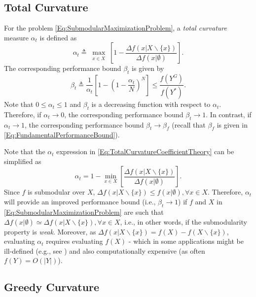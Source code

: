 \documentclass[conference]{IEEEtran}
\begin{document}
\subsection{Total Curvature \cite{Conforti1984}}
\label{SubSec:TotalCurvature}

For the problem \eqref{Eq:SubmodularMaximizationProblem}, a \emph{total curvature} measure $\alpha_t$ is defined as 
\begin{equation}\label{Eq:TotalCurvatureCoefficientTheory}
    \alpha_t \triangleq \max_{\substack{x \in X} }\left[1 - \frac{\Delta f(x \vert X \backslash \{x\})}{\Delta f(x \vert \emptyset)}\right].
\end{equation}
The corresponding performance bound $\beta_t$ is given by
\begin{equation}\label{Eq:TotalCurvatureBoundTheory}
    \beta_t \triangleq \frac{1}{\alpha_t} \left[ 1 - \left( 1 -\frac{\alpha_t}{N} \right)^N \right] \leq \frac{f(Y^G)}{f(Y^*)}.
\end{equation}
Note that $0 \leq \alpha_t \leq 1$ and $\beta_t$ is a decreasing function with respect to $\alpha_t$. Therefore, if $\alpha_t\rightarrow 0$, the corresponding performance bound $\beta_t\rightarrow 1$. In contrast, if $\alpha_t\rightarrow 1$, the corresponding performance bound $\beta_t\rightarrow\beta_f$ (recall that $\beta_f$ is given in \eqref{Eq:FundamentalPerformanceBound}).


Note that the $\alpha_t$ expression in \eqref{Eq:TotalCurvatureCoefficientTheory} can be simplified as
$$ 
    \alpha_t = 1 - \min_{x \in X}\left[\frac{\Delta f(x \vert X \backslash \{x\})}{\Delta f(x \vert \emptyset)}\right].
$$
Since $f$ is submodular over $X$, $\Delta f(x \vert X \backslash \{x\}) \leq f(x \vert \emptyset), \forall x \in X$. Therefore, $\alpha_t$ will provide an improved performance bound (i.e., $\beta_t \rightarrow 1$) if $f$ and $X$ in \eqref{Eq:SubmodularMaximizationProblem} are such that $\Delta f(x \vert \emptyset) \simeq \Delta f(x \vert X \backslash \{x\}), \forall x \in X$, i.e., in other words, if the submodularity property is \emph{weak}. Moreover, as $\Delta f(x \vert X \backslash \{x\}) = f(X) - f(X \backslash \{x\})$, evaluating $\alpha_t$ requires evaluating $f(X)$ - which in some applications might be ill-defined (e.g., see \cite{Sun2020}) and also computationally expensive (as often $f(Y)=O(\vert Y \vert)$). 



\subsection{Greedy Curvature \cite{Conforti1984}}
\label{SubSec:GreedyCurvature}
\end{document}
